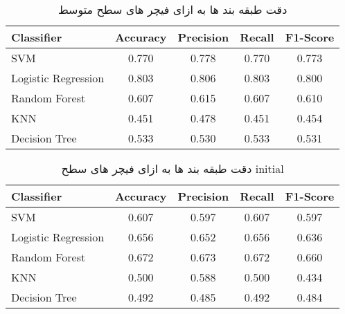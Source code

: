 \documentclass[a4paper,12pt]{article}
\begin{document}
\begin{table}[h]
	\centering
	\begin{latin}
	\begin{tabular}{|l|c|c|c|c|}
		\hline
		\textbf{Classifier} & \textbf{Accuracy} & \textbf{Precision} & \textbf{Recall} & \textbf{F1-Score} \\
		\hline
		SVM & 0.770 & 0.778 & 0.770 & 0.773 \\
		\hline
		Logistic Regression & 0.803 & 0.806 & 0.803 & 0.800 \\
		\hline
		Random Forest & 0.607 & 0.615 & 0.607 & 0.610 \\
		\hline
		KNN & 0.451 & 0.478 & 0.451 & 0.454 \\
		\hline
		Decision Tree & 0.533 & 0.530 & 0.533 & 0.531 \\
		\hline
	\end{tabular}
	\end{latin}
	\caption{دقت طبقه بند ها به ازای فیچر های سطح متوسط}
	\label{tab:classifier_performance_2}
\end{table}

\begin{table}[h]
	\centering
	\begin{latin}
	\begin{tabular}{|l|c|c|c|c|}
		\hline
		\textbf{Classifier} & \textbf{Accuracy} & \textbf{Precision} & \textbf{Recall} & \textbf{F1-Score} \\
		\hline
		SVM & 0.607 & 0.597 & 0.607 & 0.597 \\
		\hline
		Logistic Regression & 0.656 & 0.652 & 0.656 & 0.636 \\
		\hline
		Random Forest & 0.672 & 0.673 & 0.672 & 0.660 \\
		\hline
		KNN & 0.500 & 0.588 & 0.500 & 0.434 \\
		\hline
		Decision Tree & 0.492 & 0.485 & 0.492 & 0.484 \\
		\hline
	\end{tabular}
	\end{latin}
	\caption{دقت طبقه بند ها به ازای فیچر های سطح initial}
	\label{tab:classifier_performance_3}
\end{table}
\end{document}
